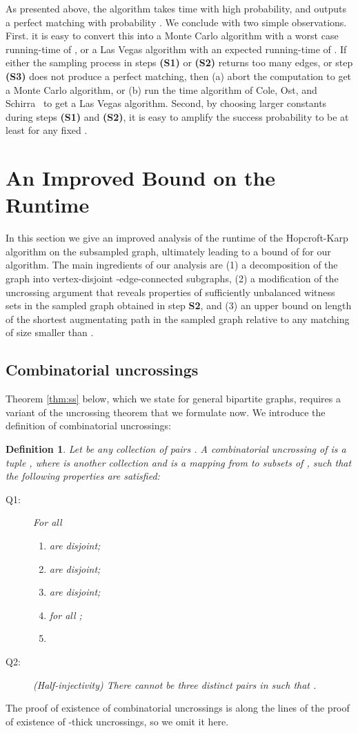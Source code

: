 \documentclass[11pt]{article}
\newtheorem{definition}[theorem]{Definition}
\begin{document}
As presented above, the algorithm takes time  with high probability, and outputs a perfect matching with probability
. We conclude with two simple observations. First.  it is easy to
convert this into a Monte Carlo algorithm with a worst case running-time of
, or a Las Vegas algorithm with an expected
running-time of .  If either the sampling
process in steps {\bf (S1)} or {\bf (S2)} returns too many edges, or step {\bf
  (S3)} does not produce a perfect matching, then (a) abort the computation to
get a Monte Carlo algorithm, or (b) run the  time algorithm of Cole,
Ost, and Schirra~\cite{cos:regular2001} to get a Las Vegas algorithm. Second,
by choosing larger constants during steps {\bf (S1)} and {\bf (S2)}, it is
easy to amplify the success probability to be at least  for
any fixed .

\section{An Improved  Bound on the
  Runtime} \label{sec:improved-runtime} 
 In this section we give an improved analysis of the runtime of the Hopcroft-Karp algorithm on the subsampled graph, ultimately leading to a bound of 
  for our algorithm. The main ingredients of our analysis are (1) a decomposition of the graph  into  vertex-disjoint -edge-connected subgraphs,  (2) a modification of the uncrossing argument that reveals properties of sufficiently unbalanced witness sets in the sampled graph obtained in step \textbf{S2}, and (3) an upper bound on 	length of the shortest augmentating path in the sampled graph relative to any matching of size smaller than . 

\subsection{Combinatorial uncrossings}  
Theorem \ref{thm:ss} below, which we state for general bipartite graphs, requires a variant of the uncrossing theorem that we formulate now. We introduce the definition of combinatorial uncrossings:
\begin{definition}
\label{define:comp-uncross}
Let  be any collection of pairs . A combinatorial uncrossing of  is a tuple , where  is another collection and  is a mapping from  to subsets of , such that the following properties are satisfied: 
\begin{description}
\item[Q1:] For all 
\begin{enumerate}
\item  are disjoint;
\item  are disjoint;
\item  are disjoint;
\item  for all ;
\item 

\end{enumerate}
\item[Q2:](Half-injectivity) There cannot be three distinct pairs  in  such that .
\end{description}
\end{definition}
The proof of existence of combinatorial uncrossings is along the lines of the proof of existence of -thick uncrossings, so we omit it here.
\end{document}
